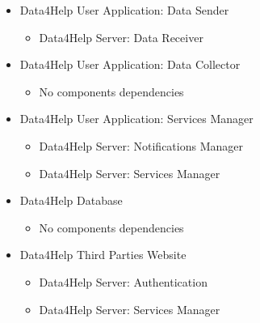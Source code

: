 \documentclass[../DD.tex]{subfiles}
\begin{document}
\begin{itemize}
	\item{Data4Help User Application: Data Sender}
	\begin{itemize}\item{Data4Help Server: Data Receiver}\end{itemize}

	\item{Data4Help User Application: Data Collector}
	\begin{itemize}\item{No components dependencies}\end{itemize}

	\item{Data4Help User Application: Services Manager}
	\begin{itemize}\item{Data4Help Server: Notifications Manager}\item{Data4Help Server: Services Manager}\end{itemize}

	\item{Data4Help Database}
	\begin{itemize}\item{No components dependencies}\end{itemize}

	\item{Data4Help Third Parties Website}
	\begin{itemize}\item{Data4Help Server: Authentication} \item{Data4Help Server: Services Manager}\end{itemize}

\end{itemize}
\end{document}
